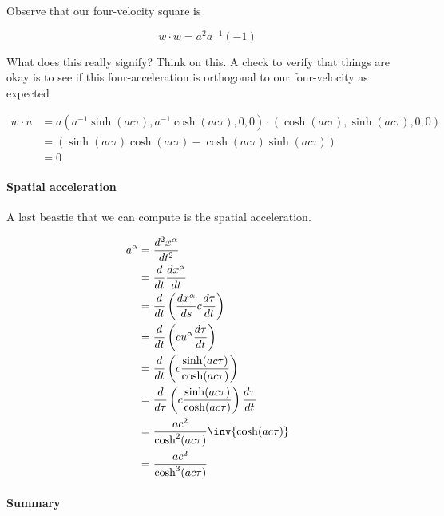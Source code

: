 {Observe that our four-velocity square is

\begin{equation}\label{eqn:relativisticElectrodynamicsT2:78}
w \cdot w = a^2 a^{-1} (-1)
\end{equation}

What does this really signify?  Think on this.  A check to verify that things are okay is to see if this four-acceleration is orthogonal to our four-velocity as expected

\begin{equation}\label{eqn:relativisticElectrodynamicsT2:2180}
\begin{aligned}
w \cdot u 
&= 
a ( a^{-1} \sinh( a c \tau), a^{-1} \cosh( a c \tau ), 0, 0 ) \cdot ( \cosh( a c \tau ), \sinh( a c \tau ), 0, 0) \\
&=
( \sinh(a c \tau)\cosh(a c \tau) - \cosh(a c \tau) \sinh(a c \tau) ) \\
&=
0
\end{aligned}
\end{equation}

\paragraph{Spatial acceleration}

A last beastie that we can compute is the spatial acceleration.

\begin{equation}\label{eqn:relativisticElectrodynamicsT2:2200}
\begin{aligned}
a^\alpha 
&= \frac{d^2 x^\alpha}{dt^2} \\
&= \frac{d}{dt} \frac{dx^\alpha}{dt} \\
&= \frac{d}{dt} \left( \frac{dx^\alpha}{ds} c \frac{d\tau}{dt} \right) \\
&= \frac{d}{dt} \left( c u^\alpha \frac{d\tau}{dt} \right) \\
&= \frac{d}{dt} \left( c \frac{\sinh(a c \tau)}{\cosh(a c \tau)} \right) \\
&= \frac{d}{d\tau} \left( c \frac{\sinh(a c \tau)}{\cosh(a c \tau)} \right) \frac{d\tau}{dt} \\
&= \frac{a c^2}{\cosh^2(a c \tau)} \inv{\cosh(a c \tau) } \\
&= \frac{a c^2}{\cosh^3(a c \tau)} \\
\end{aligned}
\end{equation}

\paragraph{Summary}

}
